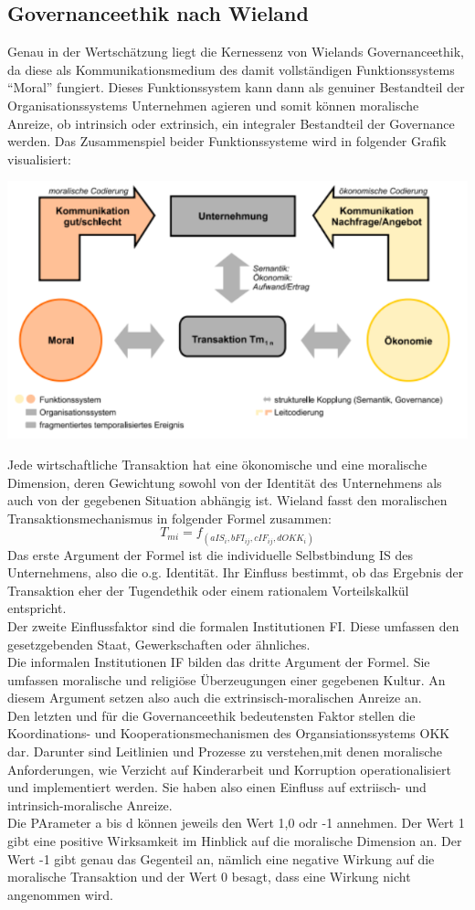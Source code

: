 \documentclass[12pt]{article}
\begin{document}
\subsection{Governanceethik nach Wieland}
Genau in der Wertschätzung liegt die Kernessenz von Wielands Governanceethik, da diese als Kommunikationsmedium des damit vollständigen Funktionssystems “Moral” fungiert. Dieses Funktionssystem kann dann als genuiner Bestandteil der Organisationssystems Unternehmen agieren und somit können moralische Anreize, ob intrinsich oder extrinsich, ein integraler Bestandteil der Governance werden. Das Zusammenspiel beider Funktionssysteme wird in folgender Grafik visualisiert:
\begin{center}
\includegraphics[width=.75\textwidth]{wieland1.png}
\end{center}
Jede wirtschaftliche Transaktion hat eine ökonomische und eine moralische Dimension, deren Gewichtung sowohl von der Identität des Unternehmens als auch von der gegebenen Situation abhängig ist. Wieland fasst den moralischen Transaktionsmechanismus in folgender Formel zusammen:
\[T_{mi}=f_{(aIS_i, bFI_{ij}, cIF_{ij}, dOKK_i)}\]
Das erste Argument der Formel ist die individuelle Selbstbindung  IS des Unternehmens, also die o.g. Identität. Ihr Einfluss bestimmt, ob das Ergebnis der Transaktion eher der Tugendethik oder einem rationalem Vorteilskalkül entspricht.\\
Der zweite Einflussfaktor sind die formalen Institutionen FI. Diese umfassen den gesetzgebenden Staat, Gewerkschaften oder ähnliches.\\
Die informalen Institutionen IF bilden das dritte Argument der Formel. Sie umfassen moralische und religiöse Überzeugungen einer gegebenen Kultur. An diesem Argument setzen also auch die extrinsisch-moralischen Anreize an.\\
Den letzten und für die Governanceethik bedeutensten Faktor stellen die Koordinations- und Kooperationsmechanismen des Organsiationssystems OKK dar. Darunter sind Leitlinien und Prozesse zu verstehen,mit denen moralische Anforderungen, wie Verzicht auf Kinderarbeit und Korruption operationalisiert und implementiert werden. Sie haben also einen Einfluss auf extriisch- und intrinsich-moralische Anreize.\\
Die PArameter a bis d können jeweils den Wert 1,0 odr -1 annehmen. Der Wert 1 gibt eine positive Wirksamkeit im Hinblick auf die moralische Dimension an. Der Wert -1 gibt genau das Gegenteil an, nämlich eine negative Wirkung auf die moralische Transaktion und der Wert 0 besagt, dass eine Wirkung nicht angenommen wird.
\end{document}
